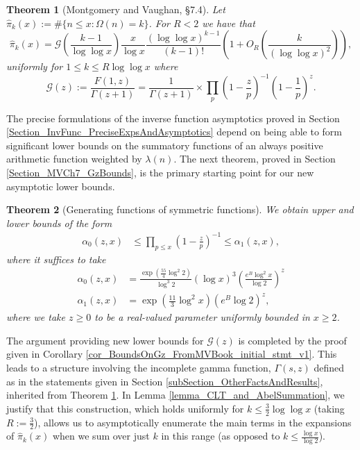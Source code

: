\documentclass[11pt,reqno,a4letter]{article}
\numberwithin{figure}{section}
\numberwithin{table}{section}
\theoremstyle{plain}
\newtheorem{theorem}{Theorem}
\numberwithin{theorem}{section}
\theoremstyle{definition}
\begin{document}
\begin{theorem}[Montgomery and Vaughan, \S 7.4]
\label{theorem_HatPi_ExtInTermsOfGz} 
Let $\widehat{\pi}_k(x) := \#\{n \leq x: \Omega(n)=k\}$. For $R < 2$ we have that 
\[
\widehat{\pi}_k(x) = \mathcal{G}\left(\frac{k-1}{\log\log x}\right) \frac{x}{\log x} 
     \frac{(\log\log x)^{k-1}}{(k-1)!} \left(1 + O_R\left(\frac{k}{(\log\log x)^2}\right)\right),  
\]
uniformly for $1 \leq k \leq R \log\log x$ where 
\[
\mathcal{G}(z) := \frac{F(1, z)}{\Gamma(z+1)} = \frac{1}{\Gamma(z+1)} \times 
     \prod_p \left(1-\frac{z}{p}\right)^{-1} \left(1-\frac{1}{p}\right)^z. 
\]
\end{theorem} 

The precise formulations of the inverse function asymptotics 
proved in Section \ref{Section_InvFunc_PreciseExpsAndAsymptotics} depend on being able to form 
significant lower bounds on the summatory functions of an always positive arithmetic function 
weighted by $\lambda(n)$. 
The next theorem, proved in Section \ref{Section_MVCh7_GzBounds}, 
is the primary starting point for our new asymptotic lower bounds. 

\begin{theorem}[Generating functions of symmetric functions] 
\label{theorem_GFs_SymmFuncs_SumsOfRecipOfPowsOfPrimes} 
We obtain upper and lower bounds of the form
\begin{align*} 
\alpha_0(z, x) & \leq \prod_{p \leq x} \left(1-\frac{z}{p}\right)^{-1} \leq \alpha_1(z, x), 
\end{align*} 
where it suffices to take 
\begin{align*}
\alpha_0(z, x) & = \frac{\exp\left(\frac{55}{4} \log^2 2\right)}{\log^3 2} (\log x)^3 
     \left(\frac{e^{B} \log^2 x}{\log 2}\right)^{z} \\ 
\alpha_1(z, x) & = \exp\left(\frac{11}{3} \log^2 x\right) \left(e^{B} \log 2\right)^{z}, 
\end{align*} 
where we take $z \geq 0$ to be a real-valued parameter uniformly bounded in $x \geq 2$. 
\end{theorem} 

The argument providing new lower bounds for $\mathcal{G}(z)$ is completed by the 
proof given in Corollary \ref{cor_BoundsOnGz_FromMVBook_initial_stmt_v1}. 
This leads to a structure involving the 
incomplete gamma function, $\Gamma(s, z)$ defined as in the statements given in 
Section \ref{subSection_OtherFactsAndResults}, 
inherited from Theorem \ref{theorem_HatPi_ExtInTermsOfGz}. 
In Lemma \ref{lemma_CLT_and_AbelSummation}, we justify that this construction, 
which holds uniformly for $k \leq \frac{3}{2} \log\log x$ (taking $R := \frac{3}{2}$), 
allows us to asymptotically enumerate the main terms 
in the expansions of $\widehat{\pi}_k(x)$ when we sum over just $k$ in this range 
(as opposed to $k \leq \frac{\log x}{\log 2}$). 
\end{document}
